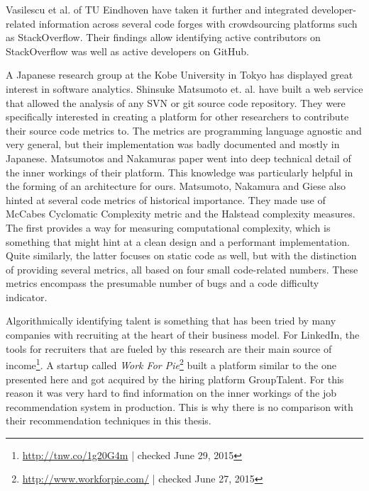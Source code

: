 Vasilescu et al. of TU Eindhoven have taken it further and integrated developer-related information across several code forges with crowdsourcing platforms such as StackOverflow\cite{vfs:2012}.
Their findings allow identifying active contributors on StackOverflow was well as active developers on GitHub.
\newline

A Japanese research group at the Kobe University in Tokyo has displayed great interest in software analytics\cite{mn:2011}. Shinsuke Matsumoto et. al. have built a web service that allowed the analysis of any SVN or git source code repository. They were specifically interested in creating a platform for other researchers to contribute their source code metrics to. The metrics are programming language agnostic and very general, but their implementation was badly documented and mostly in Japanese. Matsumotos and Nakamuras paper went into deep technical detail of the inner workings of their platform. This knowledge was particularly helpful in the forming of an architecture for ours. Matsumoto, Nakamura and Giese also hinted at several code metrics of historical importance. They made use of McCabes Cyclomatic Complexity metric\cite{mc:1976} and the Halstead complexity measures\cite{h:1977}. The first provides a way for measuring computational complexity, which is something that might hint at a clean design and a performant implementation. Quite similarly, the latter focuses on static code as well, but with the distinction of providing several metrics, all based on four small code-related numbers. These metrics encompass the presumable number of bugs and a code difficulty indicator.
\newline

Algorithmically identifying talent is something that has been tried by many companies with recruiting at the heart of their business model. For LinkedIn, the tools for recruiters that are fueled by this research are their main source of income\footnote{\url{http://tnw.co/1g20G4m} | checked June 29, 2015}. A startup called \textit{Work For Pie}\footnote{\url{http://www.workforpie.com/} | checked June 27, 2015} built a platform similar to the one presented here and got acquired by the hiring platform GroupTalent. For this reason it was very hard to find information on the inner workings of the job recommendation system in production. This is why there is no comparison with their recommendation techniques in this thesis.

